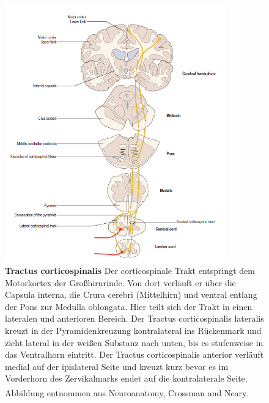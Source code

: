 \documentclass[12pt,a4paper,pdftex]{article}
\begin{document}
\begin{figure}[H]
    \centering
    \includegraphics[width=0.85\textwidth]{pictures/Bilder_Laura/corticospinal_tract.PNG}
    \caption[Tractus corticospinalis]{\textbf{Tractus corticospinalis} Der corticospinale Trakt entspringt dem Motorkortex der Großhirnrinde. Von dort verläuft er über die Capsula interna, die Crura cerebri (Mittelhirn) und ventral entlang der Pons zur Medulla oblongata. Hier teilt sich der Trakt in einen lateralen und anterioren Bereich. Der Tractus corticospinalis lateralis kreuzt in der Pyramidenkreuzung kontralateral ins Rückenmark und zieht lateral in der weißen Substanz nach unten, bis es stufenweise in das Ventralhorn eintritt. Der Tractus corticospinalis anterior verläuft medial auf der ipislateral Seite und kreuzt kurz bevor es im Vorderhorn des Zervikalmarks endet auf die kontralaterale Seite. Abbildung entnommen aus Neuroanatomy, Crossman and Neary\textsuperscript{\cite[8]{crossman2014neuroanatomy}}.}
    \label{fig:tr_corticospinalis}
\end{figure}
\end{document}
